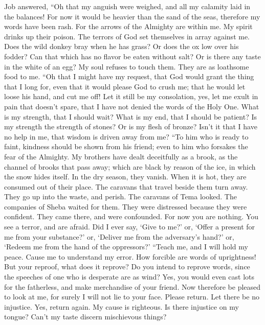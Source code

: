 Job answered,  ``Oh that my anguish were weighed, and all my
calamity laid in the balances!  For now it would be heavier
than the sand of the seas, therefore my words have been rash.
 For the arrows of the Almighty are within me. My spirit
drinks up their poison. The terrors of God set themselves in array
against me.  Does the wild donkey bray when he has grass? Or
does the ox low over his fodder?  Can that which has no
flavor be eaten without salt? Or is there any taste in the white of an
egg?  My soul refuses to touch them. They are as loathsome
food to me.  ``Oh that I might have my request, that God
would grant the thing that I long for,  even that it would
please God to crush me; that he would let loose his hand, and cut me
off!  Let it still be my consolation, yes, let me exult in
pain that doesn't spare, that I have not denied the words of the Holy
One.  What is my strength, that I should wait? What is my
end, that I should be patient?  Is my strength the strength
of stones? Or is my flesh of bronze?  Isn't it that I have
no help in me, that wisdom is driven away from me?  ``To
him who is ready to faint, kindness should be shown from his friend;
even to him who forsakes the fear of the Almighty.  My
brothers have dealt deceitfully as a brook, as the channel of brooks
that pass away;  which are black by reason of the ice, in
which the snow hides itself.  In the dry season, they
vanish. When it is hot, they are consumed out of their place.
 The caravans that travel beside them turn away. They go up
into the waste, and perish.  The caravans of Tema looked.
The companies of Sheba waited for them.  They were
distressed because they were confident. They came there, and were
confounded.  For now you are nothing. You see a terror, and
are afraid.  Did I ever say, `Give to me?' or, `Offer a
present for me from your substance?'  or, `Deliver me from
the adversary's hand?' or, `Redeem me from the hand of the oppressors?'
 ``Teach me, and I will hold my peace. Cause me to
understand my error.  How forcible are words of
uprightness! But your reproof, what does it reprove?  Do
you intend to reprove words, since the speeches of one who is desperate
are as wind?  Yes, you would even cast lots for the
fatherless, and make merchandise of your friend.  Now
therefore be pleased to look at me, for surely I will not lie to your
face.  Please return. Let there be no injustice. Yes,
return again. My cause is righteous.  Is there injustice on
my tongue? Can't my taste discern mischievous things?

